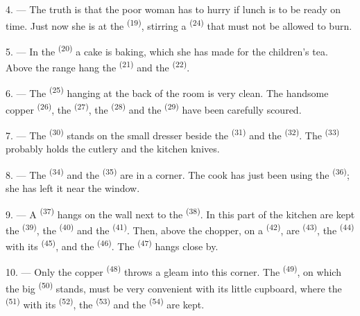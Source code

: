 4. --- The truth is that the poor woman has to hurry if lunch is to be ready on time. Just now
she is at the  \textsuperscript{(19)}, stirring a 
\textsuperscript{(24)} that must not be allowed to burn.

5. --- In the  \textsuperscript{(20)} a cake is baking, which she has made for
the children's tea. Above the range hang the  \textsuperscript{(21)} and the
 \textsuperscript{(22)}.

\VUsaut{4.0mm}
\VUsaut{3.0mm}

6. --- The  \textsuperscript{(25)} hanging at the back of the room is very
clean. The handsome copper  \textsuperscript{(26)}, the 
\textsuperscript{(27)}, the  \textsuperscript{(28)} and the 
\textsuperscript{(29)} have been carefully scoured.

7. --- The  \textsuperscript{(30)} stands on the small dresser beside the
 \textsuperscript{(31)} and the  \textsuperscript{(32)}.
The  \textsuperscript{(33)} probably holds the cutlery and the kitchen knives.

8. --- The  \textsuperscript{(34)} and the 
\textsuperscript{(35)} are in a corner. The cook has just been using the
 \textsuperscript{(36)}; she has left it near the window.

9. --- A  \textsuperscript{(37)} hangs on the wall next to the
 \textsuperscript{(38)}. In this part of the kitchen are kept the
 \textsuperscript{(39)}, the  \textsuperscript{(40)} and the
 \textsuperscript{(41)}. Then, above the chopper, on a
 \textsuperscript{(42)}, are  \textsuperscript{(43)}, the
 \textsuperscript{(44)} with its  \textsuperscript{(45)}, and
the  \textsuperscript{(46)}. The  \textsuperscript{(47)}
hangs close by.

10. --- Only the copper  \textsuperscript{(48)} throws a gleam into this corner.
The  \textsuperscript{(49)}, on which the big 
\textsuperscript{(50)} stands, must be very convenient with its little cupboard, where the
 \textsuperscript{(51)} with its  \textsuperscript{(52)}, the
 \textsuperscript{(53)} and the
 \textsuperscript{(54)} are kept.

